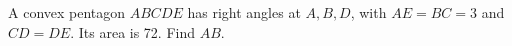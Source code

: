 A convex pentagon $ABCDE$ has right angles at $A,B,D$, with $AE=BC=3$ and $CD=DE$. Its area is 72. Find $AB$.
